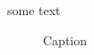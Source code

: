 \documentclass{article}
\begin{document}
some text

\begin{figure}[H]
    \centering
    
    \caption{Caption}
    \label{fig:enter-label}
\end{figure}
\end{document}
